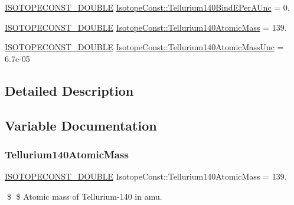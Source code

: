 \begin{DoxyCompactItemize}
\mbox{\hyperlink{group___isotope_const-_macros_ga8f45a7272ce02c0b4c65c44636ed719a}{I\+S\+O\+T\+O\+P\+E\+C\+O\+N\+S\+T\+\_\+\+D\+O\+U\+B\+LE}} \mbox{\hyperlink{group___isotope_const-_tellurium-_te140_ga06bc15d7ffba75038da453f421491f51}{Isotope\+Const\+::\+Tellurium140\+Bind\+E\+Per\+A\+Unc}} = 0.
\item 
\mbox{\hyperlink{group___isotope_const-_macros_ga8f45a7272ce02c0b4c65c44636ed719a}{I\+S\+O\+T\+O\+P\+E\+C\+O\+N\+S\+T\+\_\+\+D\+O\+U\+B\+LE}} \mbox{\hyperlink{group___isotope_const-_tellurium-_te140_ga52cf482f4262c13e98c9b0f8e30c1098}{Isotope\+Const\+::\+Tellurium140\+Atomic\+Mass}} = 139.
\item 
\mbox{\hyperlink{group___isotope_const-_macros_ga8f45a7272ce02c0b4c65c44636ed719a}{I\+S\+O\+T\+O\+P\+E\+C\+O\+N\+S\+T\+\_\+\+D\+O\+U\+B\+LE}} \mbox{\hyperlink{group___isotope_const-_tellurium-_te140_ga9cfbde82aa8b5621177315b284696934}{Isotope\+Const\+::\+Tellurium140\+Atomic\+Mass\+Unc}} = 6.\+7e-\/05
\end{DoxyCompactItemize}


\subsection{Detailed Description}


\subsection{Variable Documentation}
\mbox{\label{group___isotope_const-_tellurium-_te140_ga52cf482f4262c13e98c9b0f8e30c1098}} 
\subsubsection{\texorpdfstring{Tellurium140\+Atomic\+Mass}{Tellurium140AtomicMass}}
{\footnotesize\ttfamily \mbox{\hyperlink{group___isotope_const-_macros_ga8f45a7272ce02c0b4c65c44636ed719a}{I\+S\+O\+T\+O\+P\+E\+C\+O\+N\+S\+T\+\_\+\+D\+O\+U\+B\+LE}} Isotope\+Const\+::\+Tellurium140\+Atomic\+Mass = 139.}

\$ \$ Atomic mass of Tellurium-\/140 in amu. \mbox{\label{group___isotope_const-_tellurium-_te140_ga9cfbde82aa8b5621177315b284696934}} 
